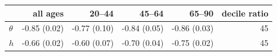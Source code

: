 \begin{tabular}{lrrrrr}
\toprule
 & all ages & 20--44 & 45--64 & 65--90 & decile ratio \\
\midrule
$\theta$ & -0.85 (0.02) & -0.77 (0.10) & -0.84 (0.05) & -0.86 (0.03) & 45 \\
$h$ & -0.66 (0.02) & -0.60 (0.07) & -0.70 (0.04) & -0.75 (0.02) & 45 \\
\bottomrule
\end{tabular}
